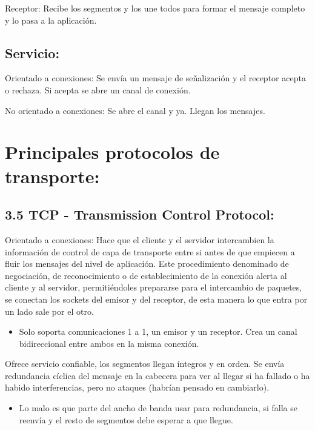 \documentclass[12pt, twoside, openright]{report} %
\begin{document}
	Receptor: Recibe los segmentos y los une todos para formar el
    mensaje completo y lo pasa a la aplicación.

	
\subsection{Servicio:}


    Orientado a conexiones: Se envía un mensaje de señalización y el
    receptor acepta o rechaza. Si acepta se abre un canal de conexión.

	No orientado a conexiones: Se abre el canal y ya. Llegan los
    mensajes.

	
\section{Principales protocolos de transporte:}
\subsection{3.5 TCP - Transmission Control Protocol:}


    Orientado a conexiones: Hace que el cliente y el servidor
    intercambien la información de control de capa de transporte entre
    si antes de que empiecen a fluir los mensajes del nivel de
    aplicación. Este procedimiento denominado de negociación, de
    reconocimiento o de establecimiento de la conexión alerta al cliente
    y al servidor, permitiéndoles prepararse para el intercambio de
    paquetes, se conectan los sockets del emisor y del receptor, de esta
    manera lo que entra por un lado sale por el otro.

    \begin{itemize}
    \item
      Solo soporta comunicaciones 1 a 1, un emisor y un receptor. Crea
      un canal bidireccional entre ambos en la misma conexión.
    \end{itemize}
  \pagebreak
    Ofrece servicio confiable, los segmentos llegan íntegros y en orden.
    Se envía redundancia cíclica del mensaje en la cabecera para ver al
    llegar si ha fallado o ha habido interferencias, pero no ataques
    (habrían pensado en cambiarlo).

    \begin{itemize}
    \item
      Lo malo es que parte del ancho de banda usar para redundancia,
      si falla se reenvía y el resto de segmentos debe esperar a que
      llegue.
    \end{itemize}
\end{document}
